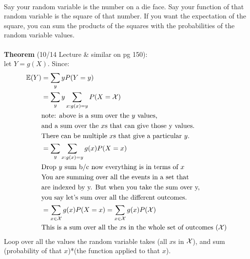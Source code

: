 \hfill \\
Say your random variable is the number on a die face.  Say your function of that random variable is the square of that number.  If you want the expectation of the square, you can sum the products of the squares with the probabilities of the random variable values.  \hfill \\
\hfill \\
\textbf{Theorem} {\tiny (10/14 Lecture \& similar on pg 150)}:  \hfill \\
let $Y = g(X)$.  Since:
	\begin{align*}
		\mathbb{E} (Y) &=  \sum\limits_{y} yP(Y=y)   \\
			& = \sum\limits_{y} y \sum\limits_{x:g(x)=y} P(X = {\cal X})  \\
			& \mbox{note: above is a sum over the $y$ values,} \\ 
			& \mbox{and a sum over the $x$s that can give those y values.} \\
			& \mbox{There can be multiple $x$s that give a particular $y$.} \\
			& = \sum\limits_{y} \sum\limits_{x:g(x)=y} g(x)P(X=x) \\
			& \mbox{Drop $y$ sum b/c now everything is in terms of $x$} \\
			& \mbox{You are summing over all the events in a set that }   \\
			& \mbox{are indexed by y.  But when you take the sum over y, }  \\
			& \mbox{you say let's sum over all the different outcomes. } \\
			& = \sum\limits_{x \in {\cal X}} g(x)P(X=x) = \sum\limits_{x \in {\cal X}} g(x)P({\cal X}) \\ 
			& \mbox{This is a sum over all the $x$s in the whole set of outcomes (${\cal X}$)} 
	\end{align*} 
Loop over all the values the random variable takes (all $x$s in ${\cal X}$), and sum (probability of that $x$)*(the function applied to that $x$).  \hfill \\
 \hfill \\
 
